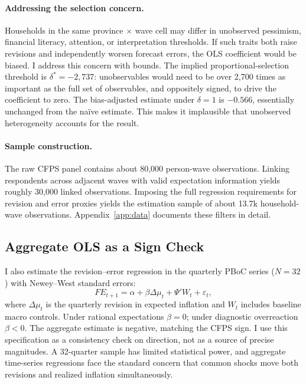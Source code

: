\paragraph{Addressing the selection concern.}
Households in the same province $\times$ wave cell may differ in unobserved
pessimism, financial literacy, attention, or interpretation thresholds.
If such traits both raise revisions and independently worsen forecast
errors, the OLS coefficient would be biased. I address this concern with
\citet{Oster2019} bounds. The implied proportional-selection threshold is
$\delta^{*} = -2{,}737$: unobservables would need to be over 2,700 times
as important as the full set of observables, and oppositely signed, to
drive the coefficient to zero. The bias-adjusted estimate under $\delta=1$
is $-0.566$, essentially unchanged from the na\"ive estimate. This makes
it implausible that unobserved heterogeneity accounts for the result.


\paragraph{Sample construction.}
The raw CFPS panel contains about 80,000 person-wave observations. Linking
respondents across adjacent waves with valid expectation information yields
roughly 30,000 linked observations. Imposing the full regression
requirements for revision and error proxies yields the estimation sample of
about 13.7k household-wave observations.
Appendix~\ref{app:data} documents these filters in detail.

\subsection{Aggregate OLS as a Sign Check}

I also estimate the revision--error regression in the quarterly PBoC
series ($N=32$) with Newey--West standard errors:
\begin{equation*}
  FE_{t+1}
  = \alpha + \beta \Delta \mu_t + \Psi'W_t + \varepsilon_t,
\end{equation*}
where $\Delta \mu_t$ is the quarterly revision in expected inflation and
$W_t$ includes baseline macro controls. Under rational expectations
$\beta = 0$; under diagnostic overreaction $\beta < 0$. The aggregate
estimate is negative, matching the CFPS sign. I use this specification as
a consistency check on direction, not as a source of precise magnitudes.
A 32-quarter sample has limited statistical power, and aggregate
time-series regressions face the standard concern that common shocks move
both revisions and realized inflation simultaneously.

